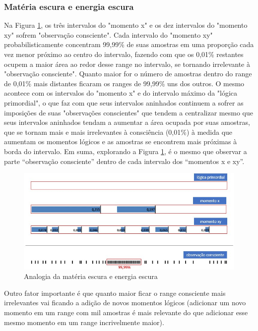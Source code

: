 \subsubsection{Matéria escura e energia escura}
Na Figura \ref{fig:consciousness_dark_matter_dark_energy}, os três intervalos do "momento x" e os dez intervalos do "momento xy" sofrem "observação consciente". Cada intervalo do "momento xy" probabilisticamente concentram 99,99\% de suas amostras em uma proporção cada vez menor próximo ao centro do intervalo, fazendo com que os 0,01\% restantes ocupem a maior área ao redor desse range no intervalo, se tornando irrelevante à "observação consciente". Quanto maior for o número de amostras dentro do range de 0,01\% mais distantes ficaram os ranges de 99,99\% uns dos outros. O mesmo acontece com os intervalos do "momento x" e do intervalo máximo da "lógica primordial", o que faz com que seus intervalos aninhados continuem a sofrer as imposições de suas "observações conscientes" que tendem a centralizar mesmo que seus intervalos aninhados tendam a aumentar a área ocupada por suas amostras, que se tornam mais e mais irrelevantes à consciência (0,01\%) à medida que aumentam os momentos lógicos e as amostras se encontrem mais próximas à borda do intervalo. Em suma, explorando a Figura \ref{fig:consciousness_dark_matter_dark_energy}, é o mesmo que observar a parte “observação consciente” dentro de cada intervalo dos “momentos x e xy”. 

\begin{figure}[H]
\caption{Analogia da matéria escura e energia escura}
\label{fig:consciousness_dark_matter_dark_energy}
\centering
\includegraphics[scale=.8]{sections/images/consciousness_dark_matter_dark_energy.jpg}
\end{figure}

Outro fator importante é que quanto maior ficar o range consciente mais irrelevantes vai ficando a adição de novos momentos lógicos (adicionar um novo momento em um range com mil amostras é mais relevante do que adicionar esse mesmo momento em um range incrivelmente maior).

